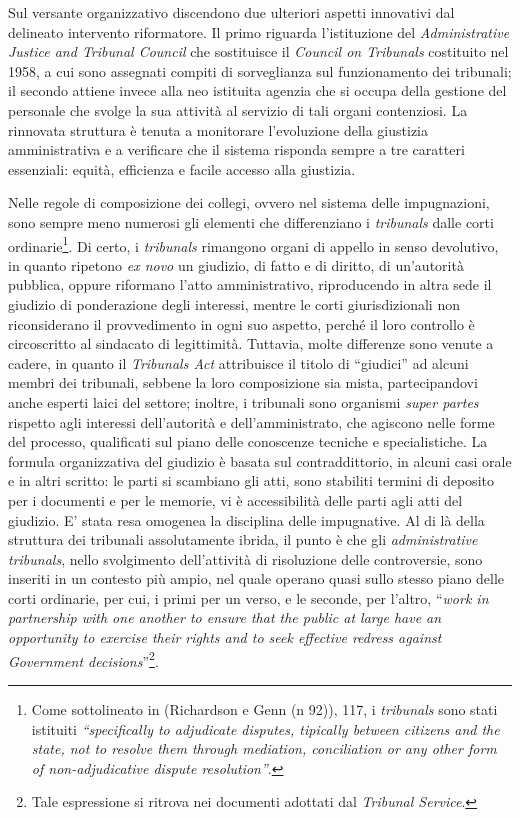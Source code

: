 \documentclass[12pt,it,a4paper,]{report}
\begin{document}
Sul versante organizzativo discendono due ulteriori aspetti innovativi
dal delineato intervento riformatore. Il primo riguarda l'istituzione
del \emph{Administrative Justice and Tribunal Council} che sostituisce
il \emph{Council on Tribunals} costituito nel 1958, a cui sono assegnati
compiti di sorveglianza sul funzionamento dei tribunali; il secondo
attiene invece alla neo istituita agenzia che si occupa della gestione
del personale che svolge la sua attività al servizio di tali organi
contenziosi. La rinnovata struttura è tenuta a monitorare l'evoluzione
della giustizia amministrativa e a verificare che il sistema risponda
sempre a tre caratteri essenziali: equità, efficienza e facile accesso
alla giustizia.

Nelle regole di composizione dei collegi, ovvero nel sistema delle
impugnazioni, sono sempre meno numerosi gli elementi che differenziano i
\emph{tribunals} dalle corti ordinarie\footnote{Come sottolineato in
  (Richardson e Genn (n 92)), 117, i \emph{tribunals} sono stati
  istituiti \emph{``specifically to adjudicate disputes, tipically
  between citizens and the state, not to resolve them through mediation,
  conciliation or any other form of non-adjudicative dispute
  resolution''}.}. Di certo, i \emph{tribunals} rimangono organi di
appello in senso devolutivo, in quanto ripetono \emph{ex novo} un
giudizio, di fatto e di diritto, di un'autorità pubblica, oppure
riformano l'atto amministrativo, riproducendo in altra sede il giudizio
di ponderazione degli interessi, mentre le corti giurisdizionali non
riconsiderano il provvedimento in ogni suo aspetto, perché il loro
controllo è circoscritto al sindacato di legittimità. Tuttavia, molte
differenze sono venute a cadere, in quanto il \emph{Tribunals Act}
attribuisce il titolo di ``giudici'' ad alcuni membri dei tribunali,
sebbene la loro composizione sia mista, partecipandovi anche esperti
laici del settore; inoltre, i tribunali sono organismi \emph{super
partes} rispetto agli interessi dell'autorità e dell'amministrato, che
agiscono nelle forme del processo, qualificati sul piano delle
conoscenze tecniche e specialistiche. La formula organizzativa del
giudizio è basata sul contraddittorio, in alcuni casi orale e in altri
scritto: le parti si scambiano gli atti, sono stabiliti termini di
deposito per i documenti e per le memorie, vi è accessibilità delle
parti agli atti del giudizio. E' stata resa omogenea la disciplina delle
impugnative. Al di là della struttura dei tribunali assolutamente
ibrida, il punto è che gli \emph{administrative tribunals}, nello
svolgimento dell'attività di risoluzione delle controversie, sono
inseriti in un contesto più ampio, nel quale operano quasi sullo stesso
piano delle corti ordinarie, per cui, i primi per un verso, e le
seconde, per l'altro, ``\emph{work in partnership with one another to
ensure that the public at large have an opportunity to exercise their
rights and to seek effective redress against Government
decisions}''\footnote{Tale espressione si ritrova nei documenti adottati
  dal \emph{Tribunal Service}.}.
\end{document}
